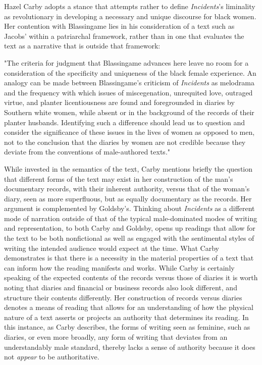 Hazel Carby adopts a stance that attempts rather to define \textit{Incidents}'s liminality as revolutionary in developing a necessary and unique discourse for black women. Her contention with Blassingame lies in his consideration of a text such as Jacobs' within a patriarchal framework, rather than in one that evaluates the text as a narrative that is outside that framework: 
\begin{displayquote}
"The criteria for judgment that Blassingame advances here leave no room for a consideration of the specificity and uniqueness of the black female experience. An analogy can be made between Blassingame's criticism of \textit{Incidents} as melodrama and the frequency with which issues of miscegenation, unrequited love, outraged virtue, and planter licentiousness are found and foregrounded in diaries by Southern white women, while absent or in the background of the records of their planter husbands. Identifying such a difference should lead us to question and consider the significance of these issues in the lives of women as opposed to men, not to the conclusion that the diaries by women are not credible because they deviate from the conventions of male-authored texts."\autocite[46]{carby_reconstructing_1987}
\end{displayquote}
While invested in the semantics of the text, Carby mentions briefly the question that different forms of the text may exist in her construction of the man's documentary records, with their inherent authority, versus that of the woman's diary, seen as more superfluous, but as equally documentary as the records. Her argument is complemented by Goldsby's. Thinking about \textit{Incidents} as a different mode of narration outside of that of the typical male-dominated modes of writing and representation, to both Carby and Goldsby, opens up readings that allow for the text to be both nonfictional as well as engaged with the sentimental styles of writing the intended audience would expect at the time. What Carby demonstrates is that there is a necessity in the material properties of a text that can inform how the reading manifests and works. While Carby is certainly speaking of the expected contents of the records versus those of diaries it is worth noting that diaries and financial or business records also look different, and structure their contents differently. Her construction of records versus diaries denotes a means of reading that allows for an understanding of how the physical nature of a text asserts or projects an authority that determines its reading. In this instance, as Carby describes, the forms of writing seen as feminine, such as diaries, or even more broadly, any form of writing that deviates from an understandably male standard, thereby lacks a sense of authority because it does not \textit{appear} to be authoritative.

